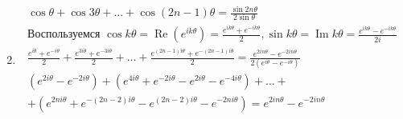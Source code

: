 \begin{sol*}
\begin{enumerate}
\begin{gather*}
        \end{gather*}
        \item
        \begin{gather*}
            \cos \theta + \cos 3\theta + \dots + \cos (2n - 1)\theta = \frac{\sin 2n\theta}{2\sin \theta} \\ 
            \textrm{Воспользуемся } \cos k\theta = \operatorname{Re} (e^{ik\theta}) = \frac{e^{ik\theta} + e^{-ik\theta}}{2}, \sin k \theta = \operatorname{Im} k\theta = \frac{e^{ik\theta} - e^{-ik\theta}}{2i} \\
            \frac{e^{i\theta} + e^{-i\theta}}{2} + \frac{e^{3i\theta} + e^{-3i\theta}}{2} + \dots + \frac{e^{(2n-1)i\theta} + e^{-(2n-1)i\theta}}{2} = \frac{e^{2in\theta} - e^{-2in\theta}}{2(e^{i\theta}-e^{-i\theta})} \\ 
            (e^{2i\theta} - e^{-2i\theta}) + (e^{4i\theta} + e^{-2i\theta} - e^{2i\theta} - e^{-4i\theta}) + \dots + \\ + (e^{2ni\theta} + e^{-(2n-2)i\theta} - e^{(2n-2)i\theta} - e^{-2ni\theta}) = e^{2in\theta} - e^{-2in\theta}\\ 
        \end{gather*}
    \end{enumerate}
\end{sol*}

